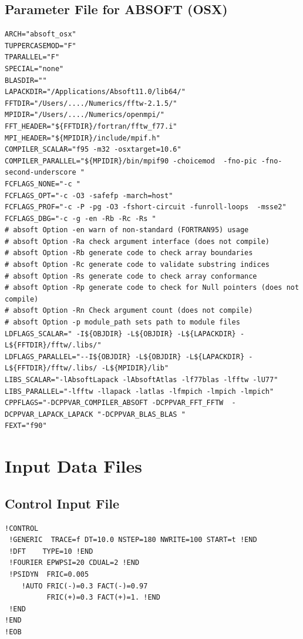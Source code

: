 \documentclass[a4paper,10pt]{report}
\begin{document}
\section{Parameter File for ABSOFT (OSX)}
\begin{verbatim}
ARCH="absoft_osx"
TUPPERCASEMOD="F"
TPARALLEL="F"
SPECIAL="none"
BLASDIR=""
LAPACKDIR="/Applications/Absoft11.0/lib64/"
FFTDIR="/Users/..../Numerics/fftw-2.1.5/"
MPIDIR="/Users/..../Numerics/openmpi/"
FFT_HEADER="${FFTDIR}/fortran/fftw_f77.i"
MPI_HEADER="${MPIDIR}/include/mpif.h"
COMPILER_SCALAR="f95 -m32 -osxtarget=10.6"
COMPILER_PARALLEL="${MPIDIR}/bin/mpif90 -choicemod  -fno-pic -fno-second-underscore "
FCFLAGS_NONE="-c "
FCFLAGS_OPT="-c -O3 -safefp -march=host"
FCFLAGS_PROF="-c -P -pg -O3 -fshort-circuit -funroll-loops  -msse2"
FCFLAGS_DBG="-c -g -en -Rb -Rc -Rs "
# absoft Option -en warn of non-standard (FORTRAN95) usage
# absoft Option -Ra check argument interface (does not compile)
# absoft Option -Rb generate code to check array boundaries
# absoft Option -Rc generate code to validate substring indices
# absoft Option -Rs generate code to check array conformance
# absoft Option -Rp generate code to check for Null pointers (does not compile)
# absoft Option -Rn Check argument count (does not compile)
# absoft Option -p module_path sets path to module files
LDFLAGS_SCALAR=" -I${OBJDIR} -L${OBJDIR} -L${LAPACKDIR} -L${FFTDIR}/fftw/.libs/"
LDFLAGS_PARALLEL="--I${OBJDIR} -L${OBJDIR} -L${LAPACKDIR} -L${FFTDIR}/fftw/.libs/ -L${MPIDIR}/lib"
LIBS_SCALAR="-lAbsoftLapack -lAbsoftAtlas -lf77blas -lfftw -lU77"
LIBS_PARALLEL="-lfftw -llapack -latlas -lfmpich -lmpich -lmpich"
CPPFLAGS="-DCPPVAR_COMPILER_ABSOFT -DCPPVAR_FFT_FFTW  -DCPPVAR_LAPACK_LAPACK "-DCPPVAR_BLAS_BLAS "
FEXT="f90"
\end{verbatim}

\newpage
\chapter{Input Data Files}
\section{Control Input File}
\begin{verbatim}
!CONTROL
 !GENERIC  TRACE=f DT=10.0 NSTEP=180 NWRITE=100 START=t !END
 !DFT    TYPE=10 !END
 !FOURIER EPWPSI=20 CDUAL=2 !END
 !PSIDYN  FRIC=0.005
    !AUTO FRIC(-)=0.3 FACT(-)=0.97
          FRIC(+)=0.3 FACT(+)=1. !END
 !END
!END
!EOB
\end{verbatim}
\end{document}
